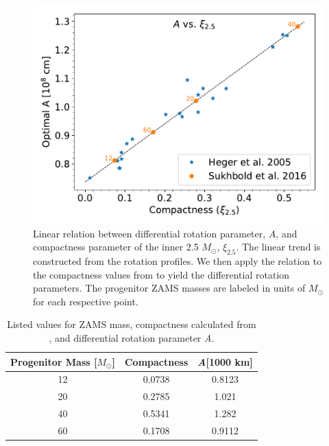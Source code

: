 \documentclass[twocolumn,times]{aastex62}  %
\begin{document}
\begin{figure}[t]
    \centering
    \includegraphics[scale=0.45]{figures/a_vs_compact.pdf}
    \caption{Linear relation between differential rotation parameter, $A$, and compactness parameter of the inner 2.5 $M_\odot$, $\xi_{2.5}$.  The linear trend is constructed from the \citet{heger:2005} rotation profiles.  We then apply the relation to the compactness values from \citet{Suk:2016} to yield the differential rotation parameters.  The progenitor ZAMS masses are labeled in units of $M_\odot$ for each respective point.}
    \label{fig:a_vs_comp}
\end{figure}

\begin{table}[h]
\begin{tabular}{c|c|c}
Progenitor Mass [$M_\odot$] & Compactness & \textit{A}[1000 km] \\
\hline
12  & 0.0738 &         0.8123             \\
20  & 0.2785 &         1.021            \\
40  & 0.5341 &         1.282           \\
60  & 0.1708 &         0.9112          
\end{tabular}
\caption{Listed values for ZAMS mass, compactness calculated from \citet{Suk:2016}, and differential rotation parameter \textit{A}.}
\label{table:compact}
\end{table}
\end{document}
